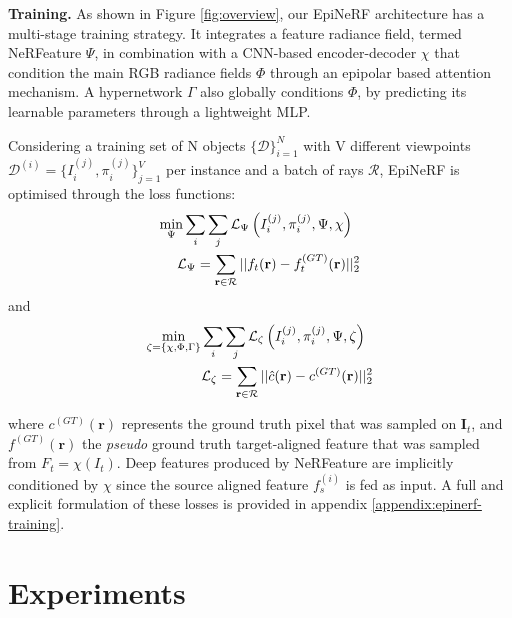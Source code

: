 \noindent\textbf{Training.} As shown in Figure \ref{fig:overview}, our EpiNeRF architecture has a multi-stage training strategy. It integrates a feature radiance field, termed NeRFeature $\Psi$, in combination with a CNN-based encoder-decoder $\chi$ that condition the main RGB radiance fields $\Phi$ through an epipolar based attention mechanism. A hypernetwork $\Gamma$ also globally conditions $\Phi$, by predicting its learnable parameters through a lightweight \ac{MLP}. 

Considering a training set of N objects $\{\mathcal{D}\}_{i=1}^{N}$ with V different viewpoints $\mathcal{D}^{(i)} = \{I_{i}^{(j)},\pi_{i}^{(j)}\}_{j=1}^{V}$ per instance and a batch of rays $\mathcal{R}$, EpiNeRF is optimised through the loss functions: 
\begin{equation}
\label{eq:nerfeature_loss}
\begin{split}
 \min_{\Psi} \sum_{i}\sum_{j}\mathcal{L}_{\Psi}\left(I_{i}^{(j)},\pi_{i}^{(j)},\Psi,\chi \right) \hspace{.2cm} \\ \hspace{.2cm}\mathcal{L}_{\Psi}= \sum_{\mathbf{r}\in\mathcal{R}} || f_{t}(\mathbf{r}) - f_{t}^{(GT)}(\mathbf{r}) ||_{2}^{2}
\end{split}
\end{equation}
and 
\begin{equation}
\label{eq:epinerf_loss}
\begin{split}
 \min_{\zeta=\{\chi,\Phi,\Gamma\}}\sum_{i}\sum_{j}\mathcal{L}_{\zeta}\left(I_{i}^{(j)},\pi_{i}^{(j)},\Psi,\zeta \right)\hspace{.2cm}  \\ \hspace{.2cm}\mathcal{L}_{\zeta}= \sum_{\mathbf{r}\in\mathcal{R}} || \hat{c}(\mathbf{r}) - c^{(GT)}(\mathbf{r}) ||_{2}^{2}
\end{split}
\end{equation}


where $c^{(GT)}(\mathbf{r})$ represents the ground truth pixel that was sampled on $\mathbf{I}_{t}$, and $f^{(GT)}(\mathbf{r})$ the \textit{pseudo} ground truth target-aligned feature that was sampled from $F_{t}=\chi(I_{t})$. Deep features produced by NeRFeature are implicitly conditioned by $\chi$ since the source aligned feature $f_s^{(i)}$ is fed as input. A full and explicit formulation of these losses  is provided in appendix \ref{appendix:epinerf-training}. 

\section{Experiments}
\label{subsec:epinerf/experiments}
